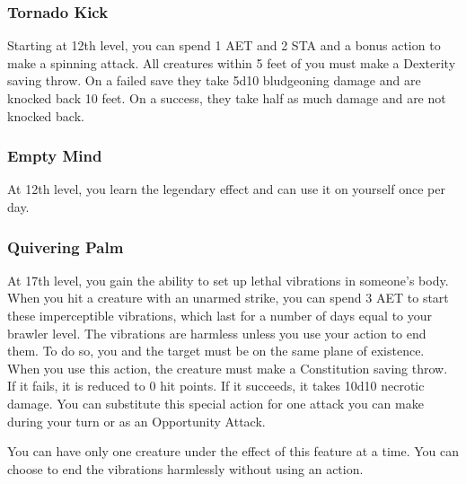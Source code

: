 \subsubsection{Tornado Kick}
Starting at 12th level, you can spend 1 AET and 2 STA and a bonus action to make a spinning attack. All creatures within 5 feet of you must make a Dexterity saving throw. On a failed save they take 5d10 bludgeoning damage and are knocked back 10 feet. On a success, they take half as much damage and are not knocked back.

\subsubsection{Empty Mind}
At 12th level, you learn the legendary effect  and can use it on yourself once per day.

\subsubsection{Quivering Palm}

At 17th level, you gain the ability to set up lethal vibrations in someone's body. When you hit a creature with an unarmed strike, you can spend 3 AET to start these imperceptible vibrations, which last for a number of days equal to your brawler level. The vibrations are harmless unless you use your action to end them. To do so, you and the target must be on the same plane of existence. When you use this action, the creature must make a Constitution saving throw. If it fails, it is reduced to 0 hit points. If it succeeds, it takes 10d10 necrotic damage. You can substitute this special action for one attack you can make during your turn or as an Opportunity Attack.

You can have only one creature under the effect of this feature at a time. You can choose to end the vibrations harmlessly without using an action.

